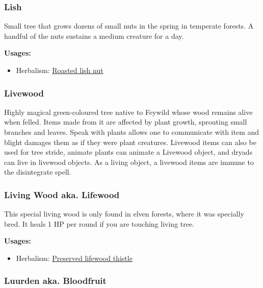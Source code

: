\subsubsection{Lish}
\label{Lish}

Small tree that grows dozens of small nuts in the spring in temperate forests. A handful of the nuts sustains a medium creature for a day.

\vspace{5mm}

\textbf{Usages:}

\begin{itemize}[noitemsep]
\item[] Herbalism: \hyperref[Roasted lish nut]{Roasted lish nut}
\end{itemize}

\subsubsection{Livewood}
\label{Livewood}

Highly magical green-coloured tree native to Feywild whose wood remains alive when felled. Items made from it are affected by plant growth, sprouting small branches and leaves. Speak with plants allows one to communicate with item and blight damages them as if they were plant creatures. Livewood items can also be used for tree stride, animate plants can animate a Livewood object, and dryads can live in livewood objects. As a living object, a livewood items are immune to the disintegrate spell.

\subsubsection{Living Wood aka. Lifewood}
\label{Lifewood}

This special living wood is only found in elven forests, where it was specially bred. It heals 1 HP per round if you are touching living tree.

\vspace{5mm}

\textbf{Usages:}

\begin{itemize}[noitemsep]
\item[] Herbalism: \hyperref[Preserved lifewood thistle]{Preserved lifewood thistle}
\end{itemize}

\subsubsection{Luurden aka. Bloodfruit}
\label{Luurden}


